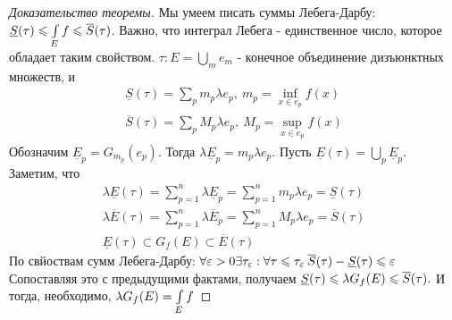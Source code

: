 \begin{proof}[Доказательство теоремы]
	Мы умеем писать суммы Лебега-Дарбу: $\underline{S}(\tau) \leqslant \int\limits_{E} f \leqslant \overline{S}(\tau)$. 
	Важно, что интеграл Лебега - единственное число, которое обладает таким свойством. $\tau : E = \bigcup\limits_{m} e_m$ - конечное объединение дизъюнктных множеств, и	
	\begin{gather*}
		\underline{S}(\tau) = \sum\limits_{p} m_p \lambda e_p, \:m_p = \inf\limits_{x \in e_p} f(x) \\
		\overline{S}(\tau) = \sum\limits_{p} M_p \lambda e_p, \:M_p = \sup\limits_{x \in e_p} f(x)
	\end{gather*}
	Обозначим $\underline{E}_p = G_{m_p}(e_p)$. Тогда $\lambda \underline{E}_p = m_p \lambda e_p$. Пусть $\underline{E}(\tau) = \bigcup\limits_{p}\underline{E}_p$.
	Заметим, что 
	\begin{gather*}
		\lambda\underline{E}(\tau) = \sum\limits_{p = 1}^{n}\lambda\underline{E}_p = \sum\limits_{p = 1}^{n} m_p \lambda e_p = \underline{S}(\tau) \\
		\lambda\overline{E}(\tau) = \sum\limits_{p = 1}^{n}\lambda\overline{E}_p = \sum\limits_{p = 1}^{n} M_p \lambda e_p = \overline{S}(\tau) \\
		\underline{E}(\tau) \subset G_f(E) \subset \overline{E}(\tau)
	\end{gather*}
	По свйоствам сумм Лебега-Дарбу: $\forall\varepsilon > 0 \exists \tau_{\varepsilon}: \forall \tau \leqslant \tau_{\varepsilon}\: 
	\overline{S}(\tau) - \underline{S}(\tau) \leqslant \varepsilon \\$
	Сопоставляя это с предыдущими фактами, получаем $\underline{S}(\tau) \leqslant \lambda G_f(E) \leqslant \overline{S}(\tau).\\$
	И тогда, необходимо, $\lambda G_f(E) = \int\limits_{E} f$
 
\end{proof}

\newpage
